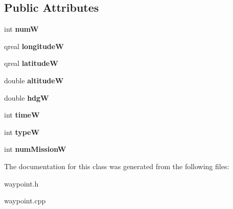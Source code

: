 \subsection*{Public Attributes}
\begin{DoxyCompactItemize}
\item 
\hypertarget{classwaypoint_a7a802bdbe863124970e59178cdacd391}{int {\bfseries num\-W}}\label{classwaypoint_a7a802bdbe863124970e59178cdacd391}

\item 
\hypertarget{classwaypoint_a2a9f33697331c147e4b0158d812c30eb}{qreal {\bfseries longitude\-W}}\label{classwaypoint_a2a9f33697331c147e4b0158d812c30eb}

\item 
\hypertarget{classwaypoint_af9a3b23154b9fc80f57c1a13d05a3703}{qreal {\bfseries latitude\-W}}\label{classwaypoint_af9a3b23154b9fc80f57c1a13d05a3703}

\item 
\hypertarget{classwaypoint_a099a67fd1e915952b05a20973029df55}{double {\bfseries altitude\-W}}\label{classwaypoint_a099a67fd1e915952b05a20973029df55}

\item 
\hypertarget{classwaypoint_abbb9bb979720cb5417c04db70ab57d35}{double {\bfseries hdg\-W}}\label{classwaypoint_abbb9bb979720cb5417c04db70ab57d35}

\item 
\hypertarget{classwaypoint_add08b0f61904d915df1af1ebfd8da567}{int {\bfseries time\-W}}\label{classwaypoint_add08b0f61904d915df1af1ebfd8da567}

\item 
\hypertarget{classwaypoint_abdb8bd6b1fa5ae195f57955fc5984f39}{int {\bfseries type\-W}}\label{classwaypoint_abdb8bd6b1fa5ae195f57955fc5984f39}

\item 
\hypertarget{classwaypoint_ac8c37db54595790f98e8a01a3d98651f}{int {\bfseries num\-Mission\-W}}\label{classwaypoint_ac8c37db54595790f98e8a01a3d98651f}

\end{DoxyCompactItemize}


The documentation for this class was generated from the following files\-:\begin{DoxyCompactItemize}
\item 
waypoint.\-h\item 
waypoint.\-cpp\end{DoxyCompactItemize}
